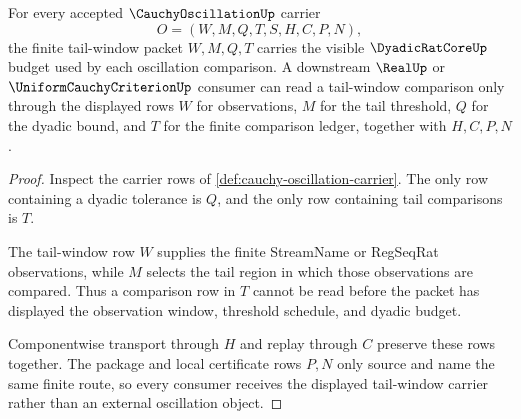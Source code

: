 \begin{theorem}
\label{thm:cauchyoscillation-tail-window-carrier-obligation}
For every accepted $\CauchyOscillationUp$ carrier
$$
O=(W,M,Q,T,S,H,C,P,N),
$$
the finite tail-window packet $W,M,Q,T$ carries the visible $\DyadicRatCoreUp$ budget used by each oscillation comparison. A downstream $\RealUp$ or $\UniformCauchyCriterionUp$ consumer can read a tail-window comparison only through the displayed rows $W$ for observations, $M$ for the tail threshold, $Q$ for the dyadic bound, and $T$ for the finite comparison ledger, together with $H,C,P,N$.
\end{theorem}
\begin{proof}
Inspect the carrier rows of \autoref{def:cauchy-oscillation-carrier}. The only row containing a dyadic tolerance is $Q$, and the only row containing tail comparisons is $T$.

The tail-window row $W$ supplies the finite StreamName or RegSeqRat observations, while $M$ selects the tail region in which those observations are compared. Thus a comparison row in $T$ cannot be read before the packet has displayed the observation window, threshold schedule, and dyadic budget.

Componentwise transport through $H$ and replay through $C$ preserve these rows together. The package and local certificate rows $P,N$ only source and name the same finite route, so every consumer receives the displayed tail-window carrier rather than an external oscillation object.
\end{proof}

